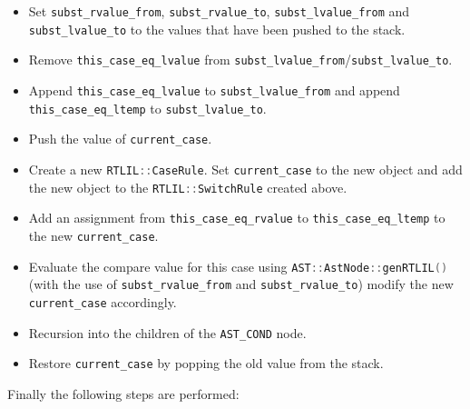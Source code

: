 \begin{sloppypar}
\begin{itemize}
\item Set \lstinline[language=C++]{subst_rvalue_from}, \lstinline[language=C++]{subst_rvalue_to},
\lstinline[language=C++]{subst_lvalue_from} and \lstinline[language=C++]{subst_lvalue_to} to the values
that have been pushed to the stack.
%
\item Remove \lstinline[language=C++]{this_case_eq_lvalue} from
\lstinline[language=C++]{subst_lvalue_from}/\lstinline[language=C++]{subst_lvalue_to}.
%
\item Append \lstinline[language=C++]{this_case_eq_lvalue} to \lstinline[language=C++]{subst_lvalue_from} and append
\lstinline[language=C++]{this_case_eq_ltemp} to \lstinline[language=C++]{subst_lvalue_to}.
%
\item Push the value of \lstinline[language=C++]{current_case}.
%
\item Create a new \lstinline[language=C++]{RTLIL::CaseRule}. Set \lstinline[language=C++]{current_case} to the
new object and add the new object to the \lstinline[language=C++]{RTLIL::SwitchRule} created above.
%
\item Add an assignment from \lstinline[language=C++]{this_case_eq_rvalue} to \lstinline[language=C++]{this_case_eq_ltemp}
to the new \lstinline[language=C++]{current_case}.
%
\item Evaluate the compare value for this case using \lstinline[language=C++]{AST::AstNode::genRTLIL()} (with the use of
\lstinline[language=C++]{subst_rvalue_from} and \lstinline[language=C++]{subst_rvalue_to}) modify the new
\lstinline[language=C++]{current_case} accordingly.
%
\item Recursion into the children of the {\tt AST\_COND} node.
%
\item Restore \lstinline[language=C++]{current_case} by popping the old value from the stack.
\end{itemize}

Finally the following steps are performed:


\end{sloppypar}
